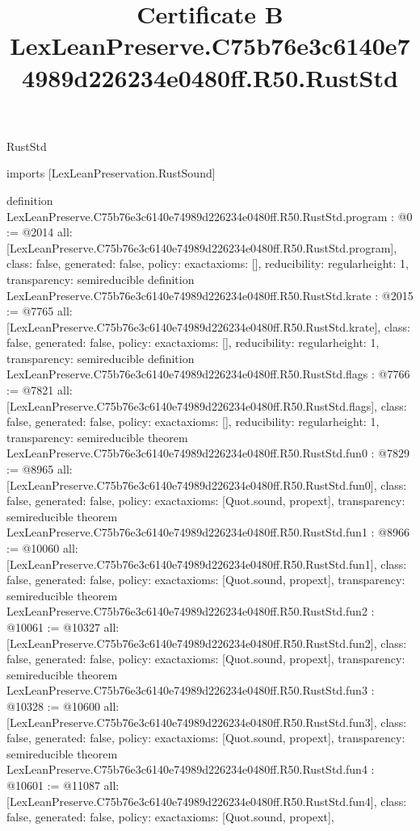 \begin{lexlean}{RustStd}
\title{Certificate B LexLeanPreserve.C75b76e3c6140e74989d226234e0480ff.R50.RustStd}
\begin{coremodule}
imports [LexLeanPreservation.RustSound]

definition LexLeanPreserve.C75b76e3c6140e74989d226234e0480ff.R50.RustStd.program : @0 := @2014 {
  all: [LexLeanPreserve.C75b76e3c6140e74989d226234e0480ff.R50.RustStd.program],
  class: false,
  generated: false,
  policy: exact{axioms: []},
  reducibility: regular{height: 1},
  transparency: semireducible
}
definition LexLeanPreserve.C75b76e3c6140e74989d226234e0480ff.R50.RustStd.krate : @2015 := @7765 {
  all: [LexLeanPreserve.C75b76e3c6140e74989d226234e0480ff.R50.RustStd.krate],
  class: false,
  generated: false,
  policy: exact{axioms: []},
  reducibility: regular{height: 1},
  transparency: semireducible
}
definition LexLeanPreserve.C75b76e3c6140e74989d226234e0480ff.R50.RustStd.flags : @7766 := @7821 {
  all: [LexLeanPreserve.C75b76e3c6140e74989d226234e0480ff.R50.RustStd.flags],
  class: false,
  generated: false,
  policy: exact{axioms: []},
  reducibility: regular{height: 1},
  transparency: semireducible
}
theorem LexLeanPreserve.C75b76e3c6140e74989d226234e0480ff.R50.RustStd.fun0 : @7829 := @8965 {
  all: [LexLeanPreserve.C75b76e3c6140e74989d226234e0480ff.R50.RustStd.fun0],
  class: false,
  generated: false,
  policy: exact{axioms: [Quot.sound, propext]},
  transparency: semireducible
}
theorem LexLeanPreserve.C75b76e3c6140e74989d226234e0480ff.R50.RustStd.fun1 : @8966 := @10060 {
  all: [LexLeanPreserve.C75b76e3c6140e74989d226234e0480ff.R50.RustStd.fun1],
  class: false,
  generated: false,
  policy: exact{axioms: [Quot.sound, propext]},
  transparency: semireducible
}
theorem LexLeanPreserve.C75b76e3c6140e74989d226234e0480ff.R50.RustStd.fun2 : @10061 := @10327 {
  all: [LexLeanPreserve.C75b76e3c6140e74989d226234e0480ff.R50.RustStd.fun2],
  class: false,
  generated: false,
  policy: exact{axioms: [Quot.sound, propext]},
  transparency: semireducible
}
theorem LexLeanPreserve.C75b76e3c6140e74989d226234e0480ff.R50.RustStd.fun3 : @10328 := @10600 {
  all: [LexLeanPreserve.C75b76e3c6140e74989d226234e0480ff.R50.RustStd.fun3],
  class: false,
  generated: false,
  policy: exact{axioms: [Quot.sound, propext]},
  transparency: semireducible
}
theorem LexLeanPreserve.C75b76e3c6140e74989d226234e0480ff.R50.RustStd.fun4 : @10601 := @11087 {
  all: [LexLeanPreserve.C75b76e3c6140e74989d226234e0480ff.R50.RustStd.fun4],
  class: false,
  generated: false,
  policy: exact{axioms: [Quot.sound, propext]},
}
\end{coremodule}
\end{lexlean}
